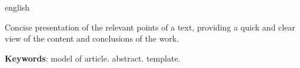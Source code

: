 

\setlength{\absparsep}{18pt} %
\begin{resumo}[Abstract]
 \begin{otherlanguage*}{english}

   Concise presentation of the relevant points of a text, providing a quick and clear view of the content and conclusions of the work.


   \textbf{Keywords}: model of article. abstract. template.
 \end{otherlanguage*}
\end{resumo}

